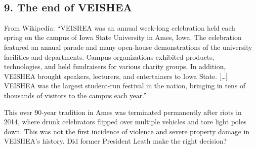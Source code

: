 \documentclass[11pt]{article}
\begin{document}
    \begin{center}
    \end{center}
    { \hspace*{\fill} \\}
    
    \hypertarget{the-end-of-veishea}{%
\subsection{9. The end of VEISHEA}\label{the-end-of-veishea}}

From Wikipedia: ``VEISHEA was an annual week-long celebration held each
spring on the campus of Iowa State University in Ames, Iowa. The
celebration featured an annual parade and many open-house demonstrations
of the university facilities and departments. Campus organizations
exhibited products, technologies, and held fundraisers for various
charity groups. In addition, VEISHEA brought speakers, lecturers, and
entertainers to Iowa State. {[}\ldots{}{]} VEISHEA was the largest
student-run festival in the nation, bringing in tens of thousands of
visitors to the campus each year.''

This over 90-year tradition in Ames was terminated permanently after
riots in 2014, where drunk celebrators flipped over multiple vehicles
and tore light poles down. This was not the first incidence of violence
and severe property damage in VEISHEA's history. Did former President
Leath make the right decision?
\end{document}
